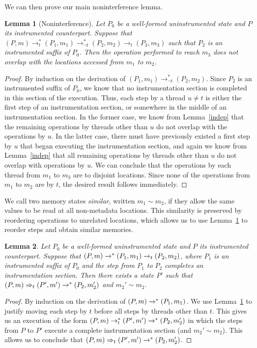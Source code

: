 \documentclass[preprint, 10pt]{sigplanconf}
\newcommand{\cfg}[2]{\ensuremath{(#1, #2)}}
\newcommand{\execstar}[4]{\ensuremath{\cfg{#1}{#2} \tto{#3} #4}}
\newcommand{\iexec}[4]{\ensuremath{\cfg{#1}{#2} \Rightarrow_{#3} #4}}
\newcommand{\execstart}[4]{\ensuremath{\cfg{#1}{#2} \rightarrow^{*}_{#3} #4}}
\newcommand{\execstarm}[4]{\ensuremath{\cfg{#1}{#2} \rightarrow^{*}_{\neg #3} #4}}
\newcommand{\execs}[3]{\ensuremath{ \xrightarrow{#2}_{#1} #3}}
\newcommand{\execstars}[2]{\ensuremath{ \tto{#1} #2}}
\newcommand{\execstarms}[2]{\ensuremath{ \rightarrow^{*}_{\neg #1} #2}}
\newcommand{\tto}[1]{\mathrel{
  \vphantom{\xrightarrow{#1}}
  \smash{\xrightarrow{#1}}
  \vphantom{\to}^{*}}
}
\newtheorem{lemma}{Lemma}
\begin{document}
We can then prove our main noninterference lemma.
\begin{lemma}[Noninterference]\label{noninterference}Let $P_0$ be a well-formed uninstrumented state and $P$ its instrumented counterpart. Suppose that $\execstart{P}{m}{t}{(P_1, m_1)} \execstarms{t}{(P_2, m_2)} \execs{t}{}{(P_3, m_3)}$ such that $P_2$ is an instrumented suffix of $P_0$. Then the operation performed to reach $m_3$ does not overlap with the locations accessed from $m_1$ to $m_2$.\end{lemma}
\begin{proof}By induction on the derivation of $\execstarm{P_1}{m_1}{t}{(P_2, m_2)}$. Since $P_2$ is an instrumented suffix of $P_0$, we know that no instrumentation section is completed in this section of the execution. Thus, each step by a thread $u \neq t$ is either the first step of an instrumentation section, or somewhere in the middle of an instrumentation section. In the former case, we know from Lemma~\ref{indep} that the remaining operations by threads other than $u$ do not overlap with the operations by $u$. In the latter case, there must have previously existed a first step by $u$ that began executing the instrumentation section, and again we know from Lemma~\ref{indep} that all remaining operations by threads other than $u$ do not overlap with operations by $u$. We can conclude that the operations by each thread from $m_1$ to $m_3$ are to disjoint locations. Since none of the operations from $m_1$ to $m_2$ are by $t$, the desired result follows immediately.\end{proof}

We call two memory states \emph{similar}, written $m_1 \sim m_2$, if they allow the same values to be read at all non-metadata locations. This similarity is preserved by reordering operations to unrelated locations, which allows us to use Lemma~\ref{noninterference} to reorder steps and obtain similar memories.
\begin{lemma}\label{first-finished}Let $P_0$ be a well-formed uninstrumented state and $P$ its instrumented counterpart. Suppose that $\execstar{P}{m}{}{(P_1, m_1)} \execs{t}{}{(P_2, m_2)}$, where $P_1$ is an instrumented suffix of $P_0$ and the step from $P_1$ to $P_2$ completes an instrumentation section. Then there exists a state $P'$ such that $\iexec{P}{m}{t}{(P', m')} \execstars{}{(P_2, m_2')}$ and $m_2' \sim m_2$.\end{lemma}
\begin{proof}By induction on the derivation of $\execstar{P}{m}{}{(P_1, m_1)}$. We use Lemma~\ref{noninterference} to justify moving each step by $t$ before all steps by threads other than $t$. This gives us an execution of the form $\execstart{P}{m}{t}{(P', m')} \execstars{}{(P_2, m_2')}$ in which the steps from $P$ to $P'$ execute a complete instrumentation section (and $m_2' \sim m_2$). This allows us to conclude that $\iexec{P}{m}{t}{(P', m')} \execstars{}{(P_2, m_2')}$.\end{proof}
\end{document}
